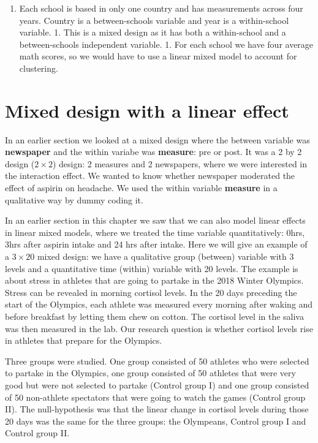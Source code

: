 \documentclass[]{report}\usepackage[]{graphicx}\usepackage[]{color}
\begin{document}
\begin{enumerate}
\item

Each school is based in only one country and has measurements across four years. Country is a between-schools variable and year is a within-school variable.
1. This is a mixed design as it has both a within-school and a between-schools independent variable. 
1. For each school we have four average math scores, so we would have to use a linear mixed model to account for clustering.



\end{enumerate}





\section{Mixed design with a linear effect}

In an earlier section we looked at a mixed design where the between variable was \textbf{newspaper} and the within variabe was \textbf{measure}: pre or post. It was a 2 by 2 design ($2 \times 2$) design: 2 measures and 2 newspapers, where we were interested in the interaction effect. We wanted to know whether newspaper moderated the effect of aspirin on headache. We used the within variable \textbf{measure} in a qualitative way by dummy coding it. 

In an earlier section in this chapter we saw that we can also model linear effects in linear mixed models, where we treated the time variable quantitatively: 0hrs, 3hrs after aspirin intake and 24 hrs after intake. Here we will give an example of a $3 \times 20$ mixed design: we have a qualitative group (between) variable with 3 levels and a quantitative time (within) variable with 20 levels. The example is about stress in athletes that are going to partake in the 2018 Winter Olympics. Stress can be revealed in morning cortisol levels. In the 20 days preceding the start of the Olympics, each athlete was measured every morning after waking and before breakfast by letting them chew on cotton. The cortisol level in the saliva was then measured in the lab. Our research question is whether cortisol levels rise in athletes that prepare for the Olympics.

Three groups were studied. One group consisted of 50 athletes who were selected to partake in the Olympics, one group consisted of 50 athletes that were very good but were not selected to partake (Control group I) and one group consisted of 50 non-athlete spectators that were going to watch the games (Control group II). The null-hypothesis was that the linear change in cortisol levels during those 20 days was the same for the three groups: the Olympeans, Control group I and Control group II. 
\end{document}
